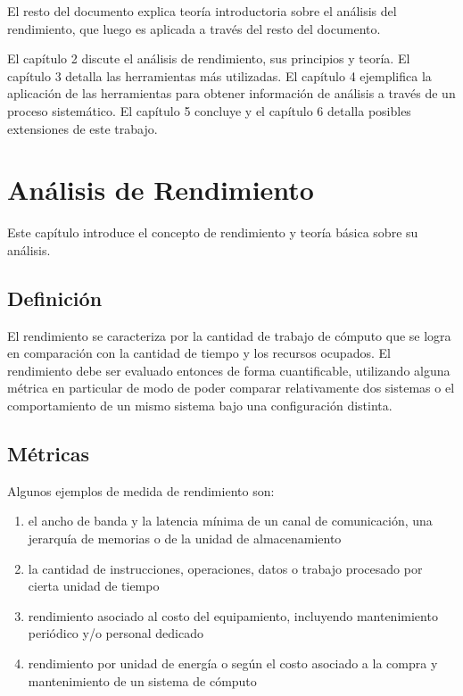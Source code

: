 \documentclass[a4paper]{report}
\begin{document}
El resto del documento explica teor\'ia introductoria sobre el an\'alisis del rendimiento, que luego es
aplicada a trav\'es del resto del documento.

\bigskip

El cap\'itulo 2 discute el an\'alisis de rendimiento, sus
principios y teor\'ia. El cap\'itulo 3 detalla las herramientas m\'as
utilizadas. El cap\'itulo 4 ejemplifica la aplicaci\'on de las herramientas
para obtener informaci\'on de an\'alisis a trav\'es de un proceso sistem\'atico.
El cap\'itulo 5 concluye y el cap\'itulo 6 detalla posibles extensiones de este trabajo.

\chapter{An\'alisis de Rendimiento}

Este cap\'itulo introduce el concepto de rendimiento y teor\'ia b\'asica sobre su an\'alisis.

\section{Definici\'on}

El rendimiento se caracteriza por la cantidad de trabajo de c\'omputo que se
logra en comparaci\'on con la cantidad de tiempo y los recursos ocupados.
El rendimiento debe ser evaluado entonces de forma cuantificable, utilizando alguna
m\'etrica en particular de modo de poder comparar relativamente dos sistemas o
el comportamiento de un mismo sistema bajo una configuraci\'on distinta.

\section{M\'etricas}

Algunos ejemplos de medida de rendimiento son:

\begin{enumerate}
\item el ancho de banda y la latencia m\'inima de un canal de comunicaci\'on,
  una jerarqu\'ia de memorias o de la unidad de almacenamiento
\item la cantidad de instrucciones, operaciones, datos o trabajo procesado
  por cierta unidad de tiempo
\item rendimiento asociado al costo del equipamiento, incluyendo mantenimiento
 peri\'odico y/o personal dedicado
\item rendimiento por unidad de energ\'ia o seg\'un el costo asociado a la compra
y mantenimiento de un sistema de c\'omputo

\end{enumerate}
\end{document}
